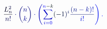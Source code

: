 \documentclass[12pt]{article}
\begin{document}
\makeatletter
\renewcommand*{\@textcolor}[3]{%
  \protect\leavevmode
  \begingroup
    \color#1{#2}#3%
  \endgroup
}
\makeatother
\begin{displaymath}
\mathcolor[RGB]{0,0,15}{\frac { \mathcolor[RGB]{0,0,30}{L} _ { \mathcolor[RGB]{0,0,45}{n} } ^ { \mathcolor[RGB]{0,0,60}{2} } } { \mathcolor[RGB]{0,0,75}{n} \mathcolor[RGB]{0,0,90}{!} } } \mathcolor[RGB]{0,0,105}{\cdot} \mathcolor[RGB]{0,0,120}{\binom { \mathcolor[RGB]{0,0,135}{n} } { \mathcolor[RGB]{0,0,150}{k} } } \mathcolor[RGB]{0,0,165}{\cdot} \mathcolor[RGB]{0,0,180}{\left(} \mathcolor[RGB]{0,0,195}{\sum} _ { \mathcolor[RGB]{0,0,210}{i} \mathcolor[RGB]{0,0,225}{=} \mathcolor[RGB]{0,0,240}{0} } ^ { \mathcolor[RGB]{0,0,255}{n} \mathcolor[RGB]{0,15,0}{-} \mathcolor[RGB]{0,15,15}{k} } \mathcolor[RGB]{0,15,30}{(} \mathcolor[RGB]{0,15,45}{-} \mathcolor[RGB]{0,15,60}{1} \mathcolor[RGB]{0,15,75}{)} ^ { \mathcolor[RGB]{0,15,90}{i} } \mathcolor[RGB]{0,15,105}{\frac { \mathcolor[RGB]{0,15,120}{(} \mathcolor[RGB]{0,15,135}{n} \mathcolor[RGB]{0,15,150}{-} \mathcolor[RGB]{0,15,165}{k} \mathcolor[RGB]{0,15,180}{)} \mathcolor[RGB]{0,15,195}{!} } { \mathcolor[RGB]{0,15,210}{i} \mathcolor[RGB]{0,15,225}{!} } } \mathcolor[RGB]{0,15,240}{\right)} \mathcolor[RGB]{0,15,255}{.}
\end{displaymath}
\end{document}

